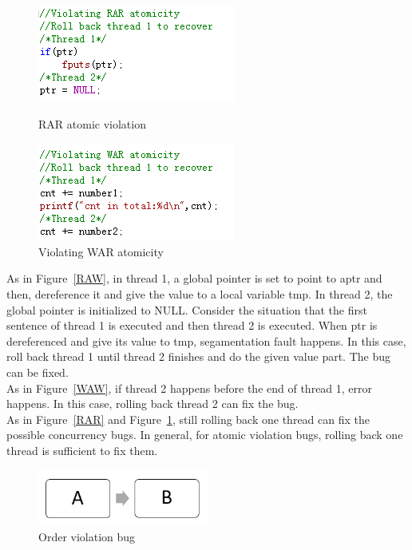 \begin{figure}
\begin{minipage}[t]{0.48\linewidth}
\centering
\includegraphics[width=\textwidth]{figs/RAR.png}
\caption{RAR atomic violation}
\label {RAR}
\end{minipage}%
\begin{minipage}[t]{0.48\linewidth}
\centering
\includegraphics[width=\textwidth]{figs/WAR.png}
\caption{Violating WAR atomicity}
\label{WAR}
\end{minipage}
\end{figure}
As in Figure~\ref{RAW}, in thread 1, a global pointer is set to point to aptr and then, dereference it and give the value to a local variable tmp. In thread 2, the global pointer is initialized to NULL. Consider the situation that the first sentence of thread 1 is executed and then thread 2 is executed. When ptr is dereferenced and give its value to tmp, segamentation fault happens. In this case, roll back thread 1 until thread 2 finishes and do the given value part. The bug can be fixed.\\
As in Figure~\ref{WAW}, if thread 2 happens before the end of thread 1, error happens. In this case, rolling back thread 2 can fix the bug.\\
As in Figure~\ref{RAR} and Figure~\ref{WAR}, still rolling back one thread can fix the possible concurrency bugs. In general, for atomic violation bugs, rolling back one thread is sufficient to fix them.
\begin{figure}[t]
\centering
\includegraphics[width=0.5\textwidth]{figs/order_violation.png}
\caption{Order violation bug}
\label{order violation}
\end{figure}
